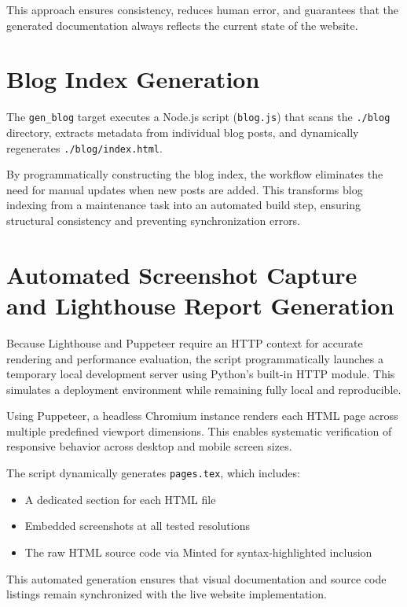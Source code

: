 \documentclass[a4paper,16pt,oneside,english]{book}
\begin{document}
This approach ensures consistency, reduces human error, and guarantees that the generated documentation always reflects the current state of the website.

\section{Blog Index Generation}

The \texttt{gen\_blog} target executes a Node.js script (\texttt{blog.js}) that scans the \texttt{./blog} directory, extracts metadata from individual blog posts, and dynamically regenerates \texttt{./blog/index.html}. 

By programmatically constructing the blog index, the workflow eliminates the need for manual updates when new posts are added. This transforms blog indexing from a maintenance task into an automated build step, ensuring structural consistency and preventing synchronization errors.

\section{Automated Screenshot Capture and Lighthouse Report Generation}

Because Lighthouse and Puppeteer require an HTTP context for accurate rendering and performance evaluation, the script programmatically launches a temporary local development server using Python’s built-in HTTP module. This simulates a deployment environment while remaining fully local and reproducible.

Using Puppeteer, a headless Chromium instance renders each HTML page across multiple predefined viewport dimensions. This enables systematic verification of responsive behavior across desktop and mobile screen sizes.

The script dynamically generates \texttt{pages.tex}, which includes:

\begin{itemize}
    \item A dedicated section for each HTML file
    \item Embedded screenshots at all tested resolutions
    \item The raw HTML source code via Minted for syntax-highlighted inclusion
\end{itemize}

This automated generation ensures that visual documentation and source code listings remain synchronized with the live website implementation.
\end{document}
